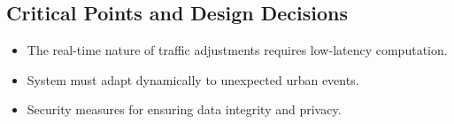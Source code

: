 \documentclass[a4paper,12pt]{article}
\begin{document}
\subsection{Critical Points and Design Decisions}
\begin{itemize}
    \item The real-time nature of traffic adjustments requires low-latency computation.
    \item System must adapt dynamically to unexpected urban events.
    \item Security measures for ensuring data integrity and privacy.
\end{itemize}
\end{document}
